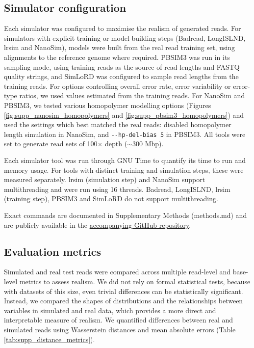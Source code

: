 \documentclass[webpdf,modern,large]{biorxiv}
\begin{document}
\subsection{Simulator configuration}
Each simulator was configured to maximise the realism of generated reads. For simulators with explicit training or model-building steps (Badread, LongISLND, lrsim and NanoSim), models were built from the real read training set, using alignments to the reference genome where required. PBSIM3 was run in its sampling mode, using training reads as the source of read lengths and FASTQ quality strings, and SimLoRD was configured to sample read lengths from the training reads. For options controlling overall error rate, error variability or error-type ratios, we used values estimated from the training reads. For NanoSim and PBSIM3, we tested various homopolymer modelling options (Figures \ref{fig:supp_nanosim_homopolymers} and \ref{fig:supp_pbsim3_homopolymers}) and used the settings which best matched the real reads: disabled homopolymer length simulation in NanoSim, and \texttt{-{}-hp-del-bias 5} in PBSIM3. All tools were set to generate read sets of 100$\times$ depth ($\sim$300 Mbp).

Each simulator tool was run through GNU Time to quantify its time to run and memory usage. For tools with distinct training and simulation steps, these were measured separately. lrsim (simulation step) and NanoSim support multithreading and were run using 16 threads. Badread, LongISLND, lrsim (training step), PBSIM3 and SimLoRD do not support multithreading.

Exact commands are documented in Supplementary Methods (methods.md) and are publicly available in the \href{https://github.com/mtaouk/ONT-Read-Simulator-Benchmarking}{accompanying GitHub repository}.


\subsection{Evaluation metrics}
Simulated and real test reads were compared across multiple read-level and base-level metrics to assess realism. We did not rely on formal statistical tests, because with datasets of this size, even trivial differences can be statistically significant. Instead, we compared the shapes of distributions and the relationships between variables in simulated and real data, which provides a more direct and interpretable measure of realism. We quantified differences between real and simulated reads using Wasserstein distances and mean absolute errors (Table \ref{tab:supp_distance_metrics}).
\end{document}
